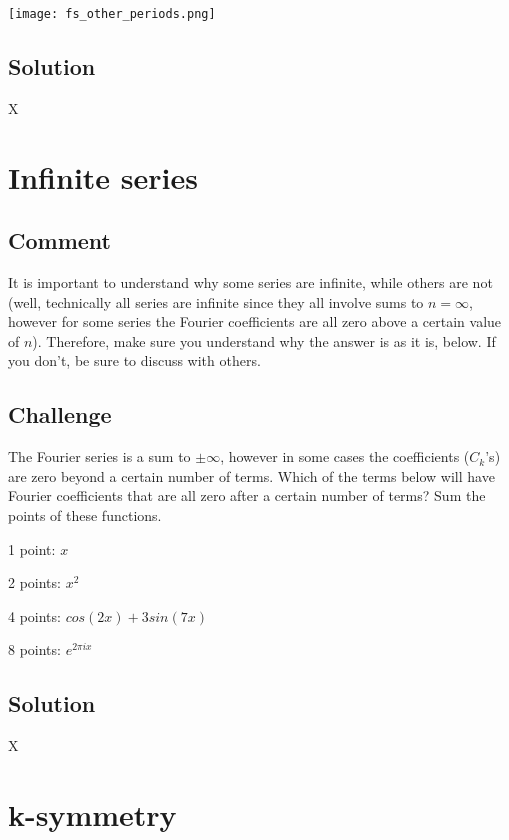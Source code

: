 \texttt{[image: fs\_other\_periods.png]}

\subsection*{Solution}
X


\timebox




\newpage
\section{Infinite series}

\subsection*{Comment}
It is important to understand why some series are infinite, while others are not (well, technically all series are infinite since they all involve sums to $n=\infty$, however for some series the Fourier coefficients are all zero above a certain value of $n$). Therefore, make sure you understand why the answer is as it is, below. If you don't, be sure to discuss with others.

\subsection*{Challenge}
The Fourier series is a sum to $\pm \infty$, however in some cases the coefficients ($C_k$'s) are zero beyond a certain number of terms. Which of the terms below will have Fourier coefficients that are all zero after a certain number of terms? Sum the points of these functions.

1 point: $x$

2 points: $x^2$

4 points: $cos(2 x) + 3 sin(7 x)$

8 points: $e^{2 \pi i x}$

\subsection*{Solution}
X


\timebox




\newpage
\section{k-symmetry}

